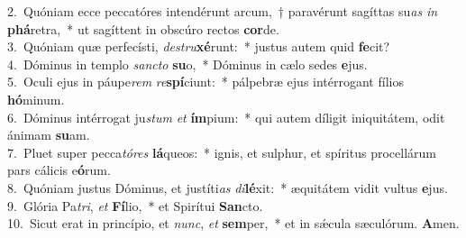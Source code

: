{2.~}Quóniam ecce peccatóres intendérunt arcum,~† paravérunt sagíttas su\textit{as} \textit{in} \textbf{phá}retra,~* ut sagíttent in obscúro rectos \textbf{cor}de.\\
{3.~}Quóniam quæ perfecísti, \textit{de}\textit{stru}\textbf{xé}runt:~* justus autem quid \textbf{fe}cit?\\
{4.~}Dóminus in templo \textit{san}\textit{cto} \textbf{su}o,~* Dóminus in cælo sedes \textbf{e}jus.\\
{5.~}Oculi ejus in páupe\textit{rem} \textit{re}\textbf{spí}ciunt:~* pálpebræ ejus intérrogant fílios \textbf{hó}minum.\\
{6.~}Dóminus intérrogat ju\textit{stum} \textit{et} \textbf{ím}pium:~* qui autem díligit iniquitátem, odit ánimam \textbf{su}am.\\
{7.~}Pluet super pecca\textit{tó}\textit{res} \textbf{lá}queos:~* ignis, et sulphur, et spíritus procellárum pars cálicis e\textbf{ó}rum.\\
{8.~}Quóniam justus Dóminus, et justíti\textit{as} \textit{di}\textbf{lé}xit:~* æquitátem vidit vultus \textbf{e}jus.\\
{9.~}Glória Pa\textit{tri}, \textit{et} \textbf{Fí}lio,~* et Spirítui \textbf{San}cto.\\
{10.~}Sicut erat in princípio, et \textit{nunc}, \textit{et} \textbf{sem}per,~* et in sǽcula sæculórum. \textbf{A}men.\\

